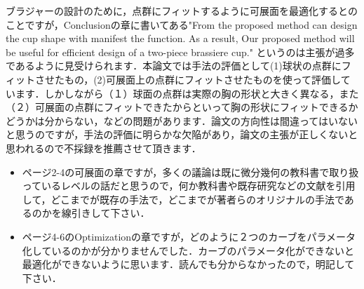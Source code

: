 \documentclass[11pt]{jsarticle}
\begin{document}
\begin{itemize}
			ブラジャーの設計のために，点群にフィットするように可展面を最適化するとのことですが，Conclusionの章に書いてある"From the proposed method can design the cup shape with manifest the function. As a result, Our proposed method will be useful for efficient design of a two-piece brassiere cup." というのは主張が過多であるように見受けられます．本論文では手法の評価として(1)球状の点群にフィットさせたもの，(2)可展面上の点群にフィットさせたものを使って評価しています．しかしながら（１）球面の点群は実際の胸の形状と大きく異なる，また（２）可展面の点群にフィットできたからといって胸の形状にフィットできるかどうかは分からない，などの問題があります．論文の方向性は間違ってはいないと思うのですが，手法の評価に明らかな欠陥があり，論文の主張が正しくないと思われるので不採録を推薦させて頂きます．
			\begin{itemize}
				\item ページ2-4の可展面の章ですが，多くの議論は既に微分幾何の教科書で取り扱っているレベルの話だと思うので，何か教科書や既存研究などの文献を引用して，どこまでが既存の手法で，どこまでが著者らのオリジナルの手法であるのかを線引きして下さい．
				\item ページ4-6のOptimizationの章ですが，どのように２つのカーブをパラメータ化しているのかが分かりませんでした．カーブのパラメータ化ができないと最適化ができないように思います．読んでも分からなかったので，明記して下さい．
			\end{itemize}
		\end{itemize}
	\newpage
\vspace{10cm}
	

\vspace{14cm}
	\articleSPRfour
	\articleSPRfive
\end{document}
